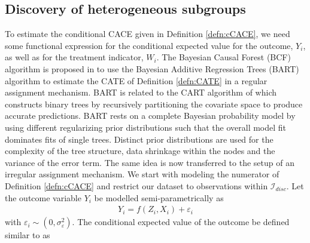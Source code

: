 \subsection{Discovery of heterogeneous subgroups}
\label{discovery}

To estimate the conditional CACE given in Definition \ref{defn:cCACE}, we need some functional expression for the conditional expected value for the outcome, $Y_i$, as well as for the treatment indicator, $W_i$.  
The Bayesian Causal Forest (BCF) algorithm is proposed in \cite{hahn_bayesian_2020} to use the Bayesian Additive Regression Trees (BART) algorithm \cite{chipman_bart_2010} to estimate the CATE of Definition \ref{defn:CATE} in a regular assignment mechanism. BART is related to the CART algorithm of \cite{Breiman1984} which constructs binary trees by recursively partitioning the covariate space to produce accurate predictions. 
BART rests on a complete Bayesian probability model by using different regularizing prior distributions such that the overall model fit dominates fits of single trees. Distinct prior distributions are used for the complexity of the tree structure, data shrinkage within the nodes and the variance of the error term. The same idea is now transferred to the setup of an irregular assignment mechanism.
We start with modeling the numerator of Definition \ref{defn:cCACE} and restrict our dataset to observations within $\mathcal{I}_{disc}$.
Let the outcome variable $Y_i$ be modelled semi-parametrically as 
\begin{align*}
    Y_i = f(Z_i, X_i) + \varepsilon_i 
\end{align*}
with $\varepsilon_i \sim \left(0, \sigma_{\varepsilon}^2\right)$. The conditional expected value of the outcome be defined similar to \cite{hahn_bayesian_2020} as 

